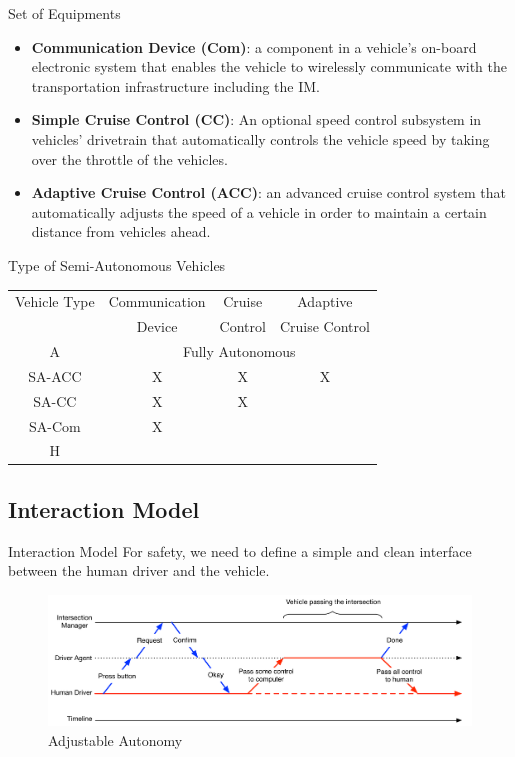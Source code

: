 \documentclass{beamer}
\begin{document}
\begin{frame}{Set of Equipments}
\begin{itemize}
\item \textbf{Communication Device (Com)}:
a component in a vehicle's on-board electronic system that enables the
vehicle to wirelessly communicate with the transportation
infrastructure including the IM.\pause
\item \textbf{Simple Cruise Control (CC)}:
An optional speed control subsystem in vehicles' drivetrain that
automatically controls the vehicle speed by taking over the throttle
of the vehicles.\pause
\item \textbf{Adaptive Cruise Control (ACC)}:
an advanced cruise control system that automatically adjusts the speed
of a vehicle in order to maintain a certain distance from vehicles
ahead.
\end{itemize}
\end{frame}

\begin{frame}{Type of Semi-Autonomous Vehicles}
\begin{tabular}{|c|c|c|c|}
  \hline
  Vehicle Type & Communication & Cruise & Adaptive \\
               & Device & Control & Cruise Control \\
  \hline
  A & \multicolumn{3}{|c|}{Fully Autonomous} \\
  \hline
  SA-ACC & X & X & X  \\
  \hline
  SA-CC & X & X &  \\
  \hline
  SA-Com & X & &  \\
  \hline
  H & & & \\
  \hline
\end{tabular}
\end{frame}

\subsection{Interaction Model}

\begin{frame}{Interaction Model}
For safety, we need to define a simple and clean interface between the
human driver and the vehicle.\pause

\begin{figure}
	\includegraphics[width=\textwidth]{figures/interaction}
	\caption{Adjustable Autonomy}
\end{figure}
\end{frame}
\end{document}
